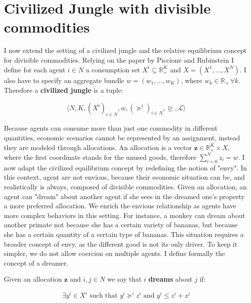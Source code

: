 


\section{Civilized Jungle with divisible commodities}
% 
I now extend the setting of a civilized jungle and the relative equilibrium concept for divisible commodities. Relying on the paper by Piccione and Rubinstein \cite[PR]{P-R} I define for each agent $i\in N$ a consumption set $X^i\subseteq\mathbb{R}_+^K$ and $X=(X^1,\dots,X^N)$. I also have to specify an aggregate bundle $w=(w_1,\dots,w_K)$, where $w_k\in\mathbb{R}_+\,\forall k$. Therefore a \textbf{civilized jungle} is a tuple:

\[\langle N,K,(X^i)_{i\in N}, w, (\succeq^i)_{i\in N}, \trianglerighteq, \mathcal{L}\rangle\]

Because agents can consume more than just one commodity in different quantities, economic scenarios cannot be represented by an assignment, instead they are modeled through allocations. An allocation is a vector $\textbf{z}\in \mathbb{R}_+^K\times X$, where the first coordinate stands for the unused goods, therefore $\sum_{i=0}^Nz_i=w$. I now adapt the civilized equilibrium concept by redefining the notion of "envy". In this context, agent are not envious, because their economic situation can be, and realistically is always, composed of divisible commodities. Given an allocation, an agent can "dream" about another agent if she sees in the dreamed one's property a more preferred allocation. We enrich the envious relationship as agents have more complex behaviors in this setting. For instance, a monkey can dream about another primate not because she has a certain variety of bananas, but because she has a certain quantity of a certain type of bananas. This situation requires a broader concept of envy, as the different good is not its only driver. To keep it simpler, we do not allow coercion on multiple agents. I define formally the concept of a dreamer.

\begin{definition}
    Given an allocation $\textbf{z}$ and $i,j\in N$ we say that $i$ \textbf{dreams} about $j$ if:

\[\exists y^i\in X^i \text{ such that } y^i\succeq^iz^i \text{ and } y^i\leq z^i+z^j\]
\end{definition}

